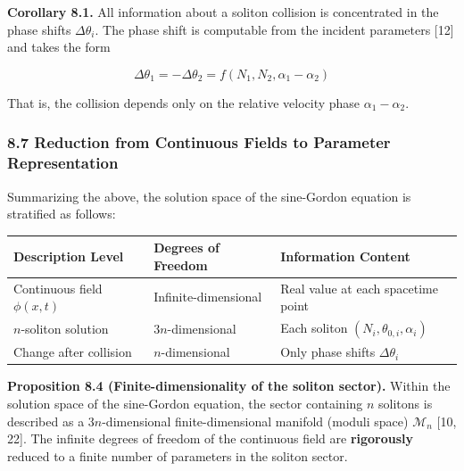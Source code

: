 \documentclass[a4paper,11pt]{article}
\newcounter{none}
\begin{document}
\textbf{Corollary 8.1.} All information about a soliton collision is
concentrated in the phase shifts \(\Delta\theta_i\). The phase shift is
computable from the incident parameters {[}12{]} and takes the form

\[\Delta\theta_1 = -\Delta\theta_2 = f(N_1, N_2, \alpha_1 - \alpha_2)\]

That is, the collision depends only on the relative velocity phase
\(\alpha_1 - \alpha_2\).

\subsubsection{8.7 Reduction from Continuous Fields to Parameter
Representation}\label{reduction-from-continuous-fields-to-parameter-representation}

Summarizing the above, the solution space of the sine-Gordon equation is
stratified as follows:

{\def\LTcaptype{none} %
\begin{longtable}[]{@{}
  >{\centering\arraybackslash}p{}
  >{\centering\arraybackslash}p{}
  >{\centering\arraybackslash}p{}@{}}
\toprule\noalign{}
\begin{minipage}[b]{\linewidth}\centering
Description Level
\end{minipage} & \begin{minipage}[b]{\linewidth}\centering
Degrees of Freedom
\end{minipage} & \begin{minipage}[b]{\linewidth}\centering
Information Content
\end{minipage} \\
\midrule\noalign{}
\endhead
\bottomrule\noalign{}
\endlastfoot
Continuous field \(\phi(x, t)\) & Infinite-dimensional & Real value at
each spacetime point \\
\(n\)-soliton solution & \(3n\)-dimensional & Each soliton
\((N_i, \theta_{0,i}, \alpha_i)\) \\
Change after collision & \(n\)-dimensional & Only phase shifts
\(\Delta\theta_i\) \\
\end{longtable}
}

\textbf{Proposition 8.4 (Finite-dimensionality of the soliton sector).}
Within the solution space of the sine-Gordon equation, the sector
containing \(n\) solitons is described as a \(3n\)-dimensional
finite-dimensional manifold (moduli space) \(\mathcal{M}_n\) {[}10,
22{]}. The infinite degrees of freedom of the continuous field are
\textbf{rigorously} reduced to a finite number of parameters in the
soliton sector.
\end{document}
